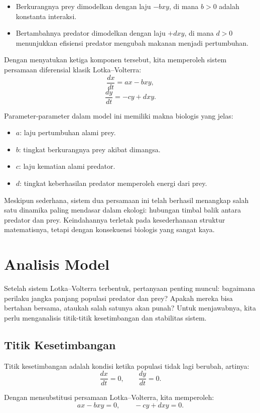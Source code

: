 \documentclass{bukumjh}
\begin{document}
\begin{itemize}
    \item Berkurangnya prey dimodelkan dengan laju $-bxy$, di mana $b>0$ adalah konstanta interaksi.
    \item Bertambahnya predator dimodelkan dengan laju $+dxy$, di mana $d>0$ menunjukkan efisiensi predator mengubah makanan menjadi pertumbuhan.
\end{itemize}

Dengan menyatukan ketiga komponen tersebut, kita memperoleh sistem persamaan diferensial klasik Lotka–Volterra:
\[
\frac{dx}{dt} = ax - bxy,
\]
\[
\frac{dy}{dt} = -cy + dxy.
\]

Parameter-parameter dalam model ini memiliki makna biologis yang jelas:
\begin{itemize}
    \item $a$: laju pertumbuhan alami prey.
    \item $b$: tingkat berkurangnya prey akibat dimangsa.
    \item $c$: laju kematian alami predator.
    \item $d$: tingkat keberhasilan predator memperoleh energi dari prey.
\end{itemize}

Meskipun sederhana, sistem dua persamaan ini telah berhasil menangkap salah satu dinamika paling mendasar dalam ekologi: hubungan timbal balik antara predator dan prey. Keindahannya terletak pada kesederhanaan struktur matematisnya, tetapi dengan konsekuensi biologis yang sangat kaya.

\section{Analisis Model}

Setelah sistem Lotka–Volterra terbentuk, pertanyaan penting muncul: bagaimana perilaku jangka panjang populasi predator dan prey? Apakah mereka bisa bertahan bersama, ataukah salah satunya akan punah? Untuk menjawabnya, kita perlu menganalisis titik-titik kesetimbangan dan stabilitas sistem.

\subsection{Titik Kesetimbangan}

Titik kesetimbangan adalah kondisi ketika populasi tidak lagi berubah, artinya:
\[
\frac{dx}{dt} = 0, \qquad \frac{dy}{dt} = 0.
\]

Dengan mensubstitusi persamaan Lotka–Volterra, kita memperoleh:
\[
ax - bxy = 0, \qquad -cy + dxy = 0.
\]
\end{document}
